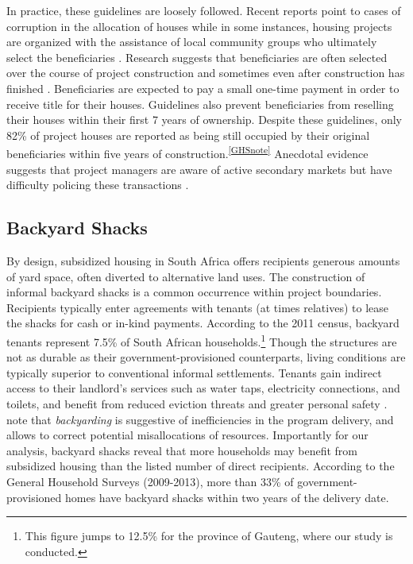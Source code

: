 \documentclass[12pt]{article}
\begin{document}
In practice, these guidelines are loosely followed.  Recent reports point to cases of corruption in the allocation of houses while in some instances, housing projects are organized with the assistance of local community groups who ultimately select the beneficiaries \citep{seriq,casestudytinazonke}.  Research suggests that beneficiaries are often selected over the course of project construction and sometimes even after construction has finished \citep{seriq}. Beneficiaries are expected to pay a small one-time payment in order to receive title for their houses.  Guidelines also prevent beneficiaries from reselling their houses within their first 7 years of ownership.  Despite these guidelines, only 82\% of project houses are reported as being still occupied by their original beneficiaries within five years of construction.\textsuperscript{\ref{GHSnote}} Anecdotal evidence suggests that project managers are aware of active secondary markets but have difficulty policing these transactions \citep{resale}.

\subsection{Backyard Shacks}

By design, subsidized housing in South Africa offers recipients generous amounts of yard space, often diverted to alternative land uses. The construction of informal backyard shacks is a common occurrence within project boundaries. Recipients typically enter agreements with tenants (at times relatives) to lease the shacks for cash or in-kind payments. According to the 2011 census, backyard tenants represent 7.5\% of South African households.\footnote{This figure jumps to 12.5\% for the province of Gauteng, where our study is conducted.} Though the structures are not as durable as their government-provisioned counterparts, living conditions are typically superior to conventional informal settlements. Tenants gain indirect access to their landlord's services such as water taps, electricity connections, and toilets, and benefit from reduced eviction threats and greater personal safety \citep{beall2003social}. \cite{Brueckner2018backyarding} note that {\it backyarding} is suggestive of inefficiencies in the program delivery, and allows to correct potential misallocations of resources. Importantly for our analysis, backyard shacks reveal that more households may benefit from subsidized housing than the listed number of direct recipients. According to the General Household Surveys (2009-2013), more than 33\% of government-provisioned homes have backyard shacks within two years of the delivery date. 
\end{document}
